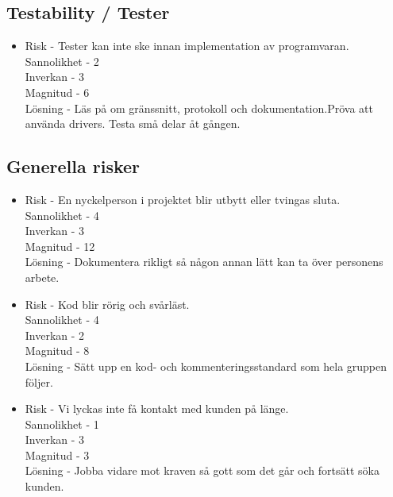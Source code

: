 \subsection{Testability / Tester}
\begin{itemize}
\item Risk - Tester kan inte ske innan implementation av programvaran.
\\Sannolikhet - 2
\\Inverkan - 3
\\Magnitud - 6
\\Lösning - Läs på om gränssnitt, protokoll och dokumentation.Pröva att använda drivers. Testa små delar åt gången.
\end{itemize}

\subsection{Generella risker}
\begin{itemize}
\item Risk - En nyckelperson i projektet blir utbytt eller tvingas sluta.
\\Sannolikhet - 4
\\Inverkan - 3
\\Magnitud - 12
\\Lösning - Dokumentera rikligt så någon annan lätt kan ta över personens arbete.
\item Risk - Kod blir rörig och svårläst.
\\Sannolikhet - 4
\\Inverkan - 2
\\Magnitud - 8
\\Lösning - Sätt upp en kod- och kommenteringsstandard som hela gruppen följer.
\item Risk - Vi lyckas inte få kontakt med kunden på länge.
\\Sannolikhet - 1
\\Inverkan - 3
\\Magnitud - 3
\\Lösning - Jobba vidare mot kraven så gott som det går och fortsätt söka kunden.
\end{itemize}



